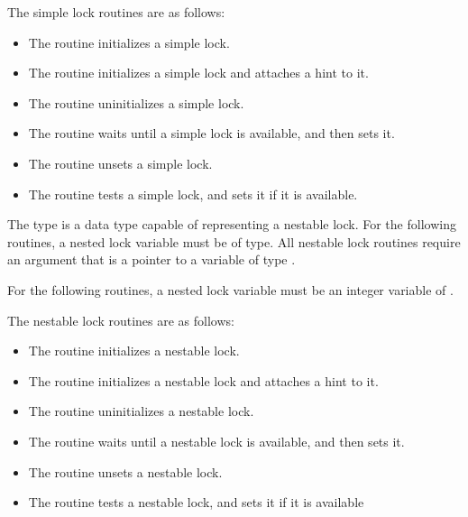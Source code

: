The simple lock routines are as follows:

\begin{itemize}
\item The  routine initializes a simple lock.

\item The  routine initializes a simple lock and attaches a hint to it.

\item The  routine uninitializes a simple lock.

\item The  routine waits until a simple lock is available, and then sets it.

\item The  routine unsets a simple lock.

\item The  routine tests a simple lock, and sets it if it is available.
\end{itemize}

\ccppspecificstart
The type  is a data type capable of representing a nestable lock. 
For the following routines, a nested lock variable must be of  type. 
All nestable lock routines require an argument that is a pointer to a variable of type 
.
\ccppspecificend

\fortranspecificstart
For the following routines, a nested lock variable must be an integer variable of 
.
\fortranspecificend

The nestable lock routines are as follows:

\begin{itemize}
\item The  routine initializes a nestable lock.

\item The  routine initializes a nestable lock and attaches a hint to it.

\item The  routine uninitializes a nestable lock.

\item The  routine waits until a nestable lock is available, and then 
sets it.

\item The  routine unsets a nestable lock.

\item The  routine tests a nestable lock, and sets it if it is 
available
\end{itemize}

